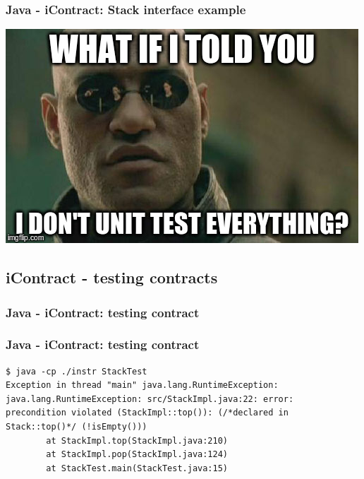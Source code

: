 \documentclass{beamer}
\begin{document}
\begin{frame}[fragile]
\frametitle{Java - iContract: Stack interface example}
\begin{center}
\includegraphics[scale=0.6]{morpheus_ut}
\end{center}
\end{frame}

\subsection{iContract - testing contracts}
\begin{frame}
\frametitle{Java - iContract: testing contract}

\end{frame}

\begin{frame}[fragile]
\frametitle{Java - iContract: testing contract}

\pause
\begin{lstlisting}[basicstyle=\ttfamily\tiny]
$ java -cp ./instr StackTest
Exception in thread "main" java.lang.RuntimeException:
java.lang.RuntimeException: src/StackImpl.java:22: error:
precondition violated (StackImpl::top()): (/*declared in Stack::top()*/ (!isEmpty()))
        at StackImpl.top(StackImpl.java:210)
        at StackImpl.pop(StackImpl.java:124)
        at StackTest.main(StackTest.java:15)
\end{lstlisting}
\end{frame}
\end{document}
